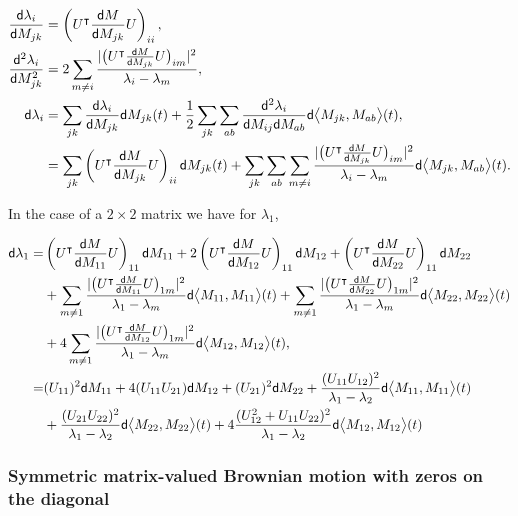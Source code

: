 \begin{align*}
    \frac{\mathsf d \lambda_i}{\mathsf d M_{jk}} &= \left(U^{\intercal} \frac{\mathsf d M}{\mathsf d M_{jk}}U\right)_{ii},\\
    \frac{\mathsf d^2 \lambda_i}{\mathsf d M_{jk}^2} &= 2 \sum_{m\neq i} \frac{\lvert  \bigl( U^{\intercal}\frac{\mathsf d M}{\mathsf d M_{jk}}U \bigr)_{im}  \rvert^2}{\lambda_i - \lambda_m},\\
    \mathsf d \lambda_i &= \sum_{jk} \frac{\mathsf d \lambda_i}{\mathsf d M_{jk}}\mathsf d M_{jk}(t) + \frac12 \sum_{jk}\sum_{ab} \frac{\mathsf d^2 \lambda_i}{\mathsf d M_{ij} \mathsf d M_{ab}} \mathsf d \bigl< M_{jk},M_{ab}\bigr>(t),\\
    &= \sum_{jk} \left(U^{\intercal} \frac{\mathsf d M}{\mathsf d M_{jk}}U\right)_{ii} \mathsf d M_{jk}(t) + \sum_{jk}\sum_{ab}  \sum_{m\neq i} \frac{\lvert  \bigl( U^{\intercal}\frac{\mathsf d M}{\mathsf d M_{jk}}U \bigr)_{im}  \rvert^2}{\lambda_i - \lambda_m} \mathsf d \bigl< M_{jk},M_{ab}\bigr>(t).
\end{align*}

In the case of a $2\times 2$ matrix we have for $\lambda_1$,

\begin{align*}
    \mathsf d \lambda_1 =& \left(U^{\intercal} \frac{\mathsf d M}{\mathsf d M_{11}}U\right)_{11}\mathsf d M_{11} + 2 \left(U^{\intercal} \frac{\mathsf d M}{\mathsf d M_{12}}U\right)_{11} \mathsf d M_{12} + \left(U^{\intercal} \frac{\mathsf d M}{\mathsf d M_{22}}U\right)_{11} \mathsf d M_{22}\\
    &+ \sum_{m\neq 1} \frac{\lvert  \bigl( U^{\intercal}\frac{\mathsf d M}{\mathsf d M_{11}}U \bigr)_{1m}  \rvert^2}{\lambda_1 - \lambda_m} \mathsf d \bigl< M_{11},M_{11}\bigr>(t) +  \sum_{m\neq 1} \frac{\lvert  \bigl( U^{\intercal}\frac{\mathsf d M}{\mathsf d M_{22}}U \bigr)_{1m}  \rvert^2}{\lambda_1 - \lambda_m} \mathsf d \bigl< M_{22},M_{22}\bigr>(t)\\
    &+ 4\sum_{m\neq 1} \frac{\lvert  \bigl( U^{\intercal}\frac{\mathsf d M}{\mathsf d M_{12}}U \bigr)_{1m}  \rvert^2}{\lambda_1 - \lambda_m} \mathsf d \bigl< M_{12},M_{12}\bigr>(t),\\
    =& (U_{11})^2 \mathsf d M_{11} + 4(U_{11}U_{21})\mathsf d M_{12} + (U_{21})^2 \mathsf d M_{22} + \frac{(U_{11}U_{12})^2}{\lambda_1 - \lambda_2}\mathsf d \bigl< M_{11},M_{11}\bigr>(t) \\
    &+ \frac{(U_{21}U_{22})^2}{\lambda_1 - \lambda_2}\mathsf d\bigl< M_{22},M_{22}\bigr>(t) + 4\frac{(U_{12}^2 + U_{11}U_{22})^2}{\lambda_1 - \lambda_2}\mathsf d\bigl< M_{12},M_{12}\bigr>(t)
\end{align*}

\subsubsection{Symmetric matrix-valued Brownian motion with zeros on the diagonal}

